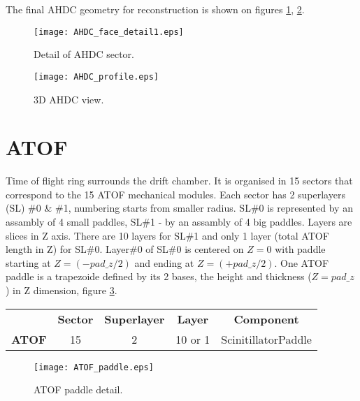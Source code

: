 The final AHDC geometry for reconstruction is shown on figures \ref{fig:ahdc_1}, \ref{fig:ahdc_2}.

\begin{figure}[H]
	\centering
	\texttt{[image: AHDC\_face\_detail1.eps]}
	\caption{Detail of AHDC sector.}
	\label{fig:ahdc_1}
\end{figure}
\begin{figure}[H]
	\centering
	\texttt{[image: AHDC\_profile.eps]}
	\caption{3D AHDC view.}
	\label{fig:ahdc_2}
\end{figure}



\section{ATOF}
Time of flight ring surrounds the drift chamber. It is organised in 15 sectors that correspond to the 15 ATOF mechanical modules. Each sector has 2 superlayers (SL) \#0 \& \#1, numbering starts from smaller radius. SL\#0 is represented by an assambly of 4 small paddles,  SL\#1 - by an assambly of 4 big paddles. Layers are slices in Z axis. There are 10 layers for SL\#1 and only 1 layer (total ATOF length in Z) for SL\#0. Layer\#0 of SL\#0 is centered on $Z = 0$ with paddle
starting at $Z = (-pad\_z /2)$ and ending at $Z = (+pad\_z /2)$. One ATOF paddle is a trapezoide defined by its 2 bases, the height and thickness ($Z = pad\_z$) in Z dimension, figure \ref{fig:atof_1}.     
\begin{table}[H]
\centering
			\begin{tabular}{ccccc}
              & \textbf{Sector} & \textbf{Superlayer} & \textbf{Layer} & \textbf{Component}                                  \\
\textbf{ATOF} & 15              & 2                   & 10 or 1         & ScinitillatorPaddle
			\end{tabular}
	\end{table}	

\begin{figure}[H]
	\centering
	\texttt{[image: ATOF\_paddle.eps]}
	\caption{ATOF paddle detail.}
	\label{fig:atof_1}
\end{figure}

